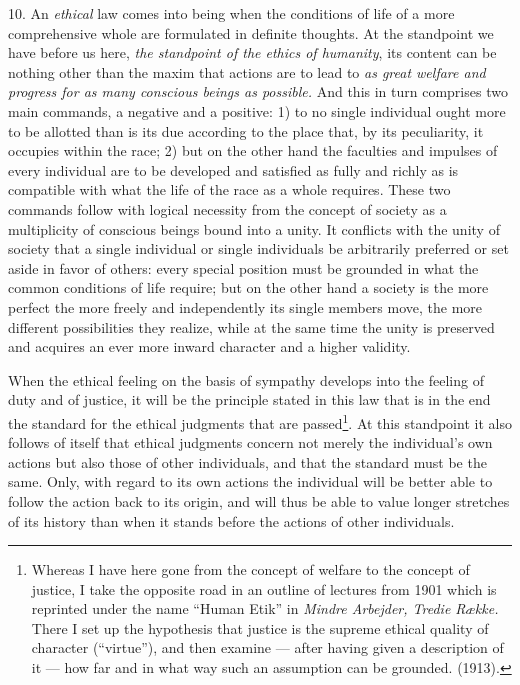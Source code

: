 \documentclass[12pt,a4paper,openany]{book}
\newcommand{\opage}[1]{\marginnote{\footnotesize\textit{[#1]}}}
\begin{document}
10. An \textit{ethical} law comes into being when the conditions of life of a more comprehensive whole
are formulated in definite thoughts. At the standpoint we have before us here, \textit{the standpoint
of the ethics of humanity}, its content can be nothing other than the maxim that actions are to lead
to \textit{as great welfare and progress for as many conscious beings as possible.} And this in turn
comprises two main commands, a negative and a positive: 1) to no single individual ought more to be
allotted than is its due according to the place that, by its peculiarity, it occupies within the
race; 2) but on the other hand the faculties and impulses of every individual are to be developed and
satisfied as fully and richly as is compatible with what the life of the race as a whole requires.
These two commands follow with logical necessity from the concept of society as a multiplicity of
conscious beings bound into a unity. It conflicts with the unity of society that a single individual
or single individuals be arbitrarily preferred or set aside in favor of others: every special
position must be grounded in what the common conditions of life require; but on the other hand a
society is the more perfect the more freely and independently its single members move, the more
different possibilities they realize, while at the same time the unity is preserved and acquires an
ever more inward character and a higher validity.

When the ethical feeling on the basis of sympathy develops into the feeling of duty and of justice,
it will be the principle stated in this law that is in the end the standard for the ethical
judgments that are passed\footnote[1]{Whereas I have here gone from the concept of welfare to the
concept of justice, I take the opposite road in an outline of lectures from 1901 which is reprinted
under the name ``Human Etik'' in \textit{Mindre Arbejder, Tredie Række.} There I set up the
hypothesis that justice is the supreme ethical quality of character (``virtue''), and then examine
--- after having given a description of it --- how far and in what way such an assumption can be
grounded. (1913).}. At this standpoint it also follows of itself that ethical judgments concern not
merely the individual's own actions but also those of other individuals, and that the
\opage{43}standard must be the same. Only, with regard to its own actions the individual will be better able
to follow the action back to its origin, and will thus be able to value longer stretches of its
history than when it stands before the actions of other individuals.
\end{document}
